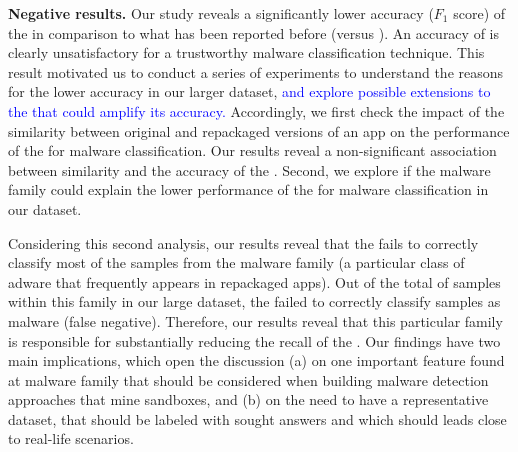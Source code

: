 {\bf Negative results.} Our study reveals a significantly lower
accuracy ($F_1$ score) of the \mas in comparison to what has been reported before (\fscore versus \fscoreSmall). 
An accuracy of \fscore is clearly unsatisfactory for a trustworthy malware classification technique.
This result motivated us to conduct a series of experiments 
to understand the reasons for the lower accuracy in our larger dataset, \textcolor{blue}{and explore possible extensions to the \mas that could amplify its accuracy.}
Accordingly, we first check the impact of the similarity between original and repackaged versions of
an app on the performance of the \mas for malware classification. Our results reveal a non-significant association between similarity and the accuracy of the \mas. 
Second, we explore if the
malware family could explain the lower performance of the \mas for malware classification in 
our dataset.

Considering this second analysis, our results reveal that the \mas fails to correctly classify most of the samples from
the \gps malware family (a particular class of adware that frequently appears in repackaged apps). 
Out of the total of \appsGps samples within this family in our large dataset, the \mas failed to correctly classify \appsGpsFN samples as malware (false negative).
Therefore, our results reveal that this particular family is responsible for substantially reducing the recall of the \mas.
Our findings have two main implications, which open the discussion (a) on one important feature found at \gps malware family that should be
considered when building malware detection approaches that mine sandboxes, and (b) on the need to have a representative dataset, that should be labeled with sought
answers and which should leads close to real-life scenarios.
  

%

